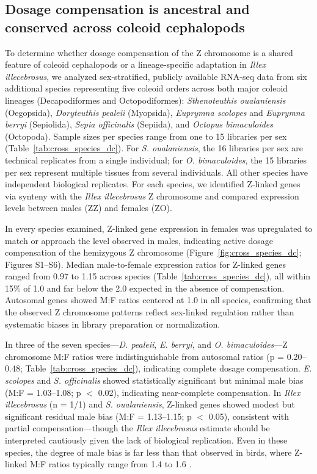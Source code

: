 \documentclass[12pt]{article}
\newcommand{\citep}{\parencite}
\newcommand{\illex}{\textit{Illex illecebrosus}\xspace}
\begin{document}
\subsection*{Dosage compensation is ancestral and conserved across coleoid cephalopods}

To determine whether dosage compensation of the Z chromosome is a shared feature of coleoid cephalopods
or a lineage-specific adaptation in \illex,
we analyzed sex-stratified, publicly available RNA-seq data from
six additional species representing five coleoid orders
across both major coleoid lineages (Decapodiformes and Octopodiformes):
\textit{Sthenoteuthis oualaniensis} (Oegopsida),
\textit{Doryteuthis pealeii} (Myopsida),
\textit{Euprymna scolopes} and \textit{Euprymna berryi} (Sepiolida),
\textit{Sepia officinalis} (Sepiida),
and \textit{Octopus bimaculoides} (Octopoda).
Sample sizes per species range from one to 15 libraries per sex
(Table~\ref{tab:cross_species_dc}).
For \textit{S. oualaniensis}, the 16 libraries per sex are technical replicates
from a single individual; for \textit{O. bimaculoides}, the 15 libraries per sex
represent multiple tissues from several individuals.
All other species have independent biological replicates.
For each species, we identified Z-linked genes via synteny with the \illex Z chromosome
and compared expression levels between males (ZZ) and females (ZO).

In every species examined, Z-linked gene expression in females was upregulated
to match or approach the level observed in males,
indicating active dosage compensation of the hemizygous Z chromosome
(Figure~\ref{fig:cross_species_dc}; Figures S1--S6).
Median male-to-female expression ratios for Z-linked genes ranged from 0.97 to 1.15 across species
(Table~\ref{tab:cross_species_dc}),
all within 15\% of 1.0 and far below the 2.0 expected in the absence of compensation.
Autosomal genes showed M:F ratios centered at 1.0 in all species,
confirming that the observed Z chromosome patterns reflect sex-linked regulation
rather than systematic biases in library preparation or normalization.

In three of the seven species---\textit{D. pealeii},
\textit{E. berryi}, and \textit{O. bimaculoides}---Z chromosome
M:F ratios were indistinguishable from autosomal ratios
(p = 0.20--0.48; Table~\ref{tab:cross_species_dc}),
indicating complete dosage compensation.
\textit{E. scolopes} and \textit{S. officinalis} showed statistically significant but minimal male bias
(M:F = 1.03--1.08; p $<$ 0.02), indicating near-complete compensation.
In \illex{} (n = 1/1) and \textit{S. oualaniensis},
Z-linked genes showed modest but significant residual male bias
(M:F = 1.13--1.15; p $<$ 0.05),
consistent with partial compensation---though the \illex{} estimate
should be interpreted cautiously given the lack of biological replication.
Even in these species, the degree of male bias is far less
than that observed in birds, where Z-linked M:F ratios typically range from 1.4 to 1.6
\citep{mank2009w}.
\end{document}
